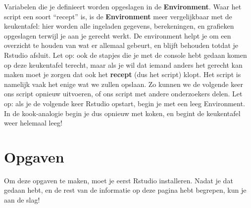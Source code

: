 \documentclass[
  a4paper,
]{scrbook}
\theoremstyle{definition}
\theoremstyle{remark}
\begin{document}
Variabelen die je definieert worden opgeslagen in de
\textbf{Environment}. Waar het script een soort ``recept'' is, is de
\textbf{Environment} meer vergelijkbaar met de keukentafel: hier worden
alle ingeladen gegevens, berekeningen, en grafieken opgeslagen terwijl
je aan je gerecht werkt. De environment helpt je om een overzicht te
houden van wat er allemaal gebeurt, en blijft behouden totdat je Rstudio
afsluit. Let op: ook de stapjes die je met de console hebt gedaan komen
op deze keukentafel terecht, maar als je wil dat iemand anders het
gerecht kan maken moet je zorgen dat ook het \textbf{recept} (dus het
script) klopt. Het script is namelijk vaak het enige wat we zullen
opslaan. Zo kunnen we de volgende keer ons script opnieuw uitvoeren, of
ons script met andere onderzoekers delen. Let op: als je de volgende
keer Rstudio opstart, begin je met een leeg Environment. In de
kook-analogie begin je dus opnieuw met koken, en begint de keukentafel
weer helemaal leeg!

\section{Opgaven}\label{opgaven}

Om deze opgaven te maken, moet je eerst Rstudio installeren. Nadat je
dat gedaan hebt, en de rest van de informatie op deze pagina hebt
begrepen, kun je aan de slag!
\end{document}
